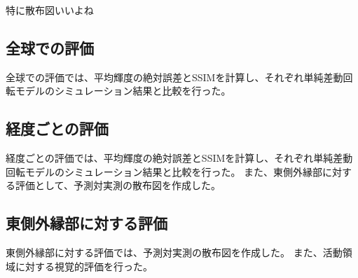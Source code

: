     特に散布図いいよね

    \subsection{全球での評価}
      全球での評価では、平均輝度の絶対誤差とSSIMを計算し、それぞれ単純差動回転モデルのシミュレーション結果と比較を行った。
    
    \subsection{経度ごとの評価}
      経度ごとの評価では、平均輝度の絶対誤差とSSIMを計算し、それぞれ単純差動回転モデルのシミュレーション結果と比較を行った。
      また、東側外縁部に対する評価として、予測対実測の散布図を作成した。
      
    \subsection{東側外縁部に対する評価}
      東側外縁部に対する評価では、予測対実測の散布図を作成した。
      また、活動領域に対する視覚的評価を行った。